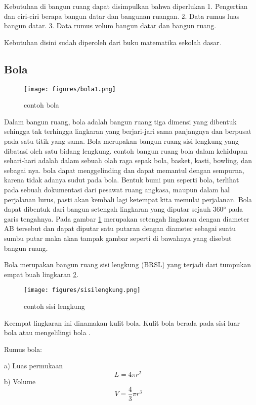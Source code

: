 Kebutuhan di bangun ruang dapat disimpulkan bahwa diperlukan 
1.    Pengertian dan ciri-ciri berapa bangun datar dan bangunan ruangan.
2.    Data rumus luas bangun datar.
3.    Data rumus volum bangun datar dan bangun ruang.

Kebutuhan disini sudah diperoleh dari buku matematika sekolah dasar.

\subsection{Bola} 

\begin{figure}[ht]
    \centering
	\texttt{[image: figures/bola1.png]}
    \caption{contoh bola}
    \label{bola1}
\end{figure}

Dalam bangun ruang, bola adalah bangun ruang tiga dimensi yang dibentuk sehingga tak terhingga lingkaran yang berjari-jari sama panjangnya dan berpusat pada satu titik yang sama. Bola merupakan bangun ruang sisi lengkung yang dibatasi oleh satu bidang lengkung.
contoh bangun ruang bola dalam kehidupan sehari-hari adalah dalam sebuah olah raga sepak bola, basket, kasti, bowling, dan sebagai nya. bola dapat menggelinding dan dapat memantul dengan sempurna, karena tidak adanya sudut pada bola. 
Bentuk bumi pun seperti bola, terlihat pada sebuah dokumentasi dari pesawat ruang angkasa, maupun dalam hal perjalanan lurus, pasti akan kembali lagi ketempat kita memulai perjalanan.
Bola dapat dibentuk dari bangun setengah lingkaran yang diputar sejauh 360° pada garis tengahnya. 
Pada gambar  \ref{bola1} merupakan setengah lingkaran dengan diameter AB  tersebut dan dapat diputar satu putaran dengan diameter sebagai suatu sumbu putar maka akan tampak gambar seperti di bawahnya yang disebut bangun ruang.


Bola merupakan bangun ruang sisi lengkung (BRSL) yang terjadi dari tumpukan empat buah lingkaran \ref{sisilengkung}.
\begin{figure}[ht]
    \centering
\texttt{[image: figures/sisilengkung.png]}
    \caption{contoh sisi lengkung}
    \label{sisilengkung}
    \end{figure} 
Keempat lingkaran ini dinamakan kulit bola. Kulit bola berada pada sisi luar bola atau mengelilingi bola \cite{nurfarikhin2010hubungan}.

Rumus bola:

a) Luas permukaan
 \begin{equation}
     L = 4 \pi r^2 \,
\end{equation}
b) Volume
\begin{equation}
     V = \frac{4}{3}\pi r^3
\end{equation}
